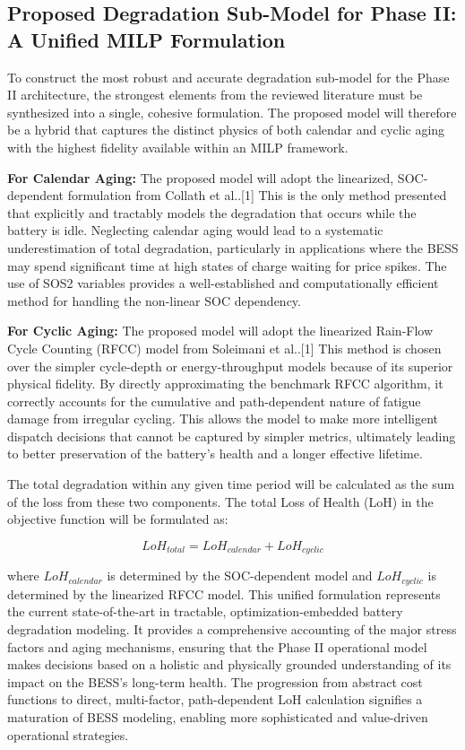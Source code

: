 \subsection{Proposed Degradation Sub-Model for Phase II: A Unified MILP Formulation}

To construct the most robust and accurate degradation sub-model for the Phase II architecture, the strongest elements from the reviewed literature must be synthesized into a single, cohesive formulation. The proposed model will therefore be a hybrid that captures the distinct physics of both calendar and cyclic aging with the highest fidelity available within an MILP framework.

\textbf{For Calendar Aging:} The proposed model will adopt the linearized, SOC-dependent formulation from Collath et al..[1] This is the only method presented that explicitly and tractably models the degradation that occurs while the battery is idle. Neglecting calendar aging would lead to a systematic underestimation of total degradation, particularly in applications where the BESS may spend significant time at high states of charge waiting for price spikes. The use of SOS2 variables provides a well-established and computationally efficient method for handling the non-linear SOC dependency.

\textbf{For Cyclic Aging:} The proposed model will adopt the linearized Rain-Flow Cycle Counting (RFCC) model from Soleimani et al..[1] This method is chosen over the simpler cycle-depth or energy-throughput models because of its superior physical fidelity. By directly approximating the benchmark RFCC algorithm, it correctly accounts for the cumulative and path-dependent nature of fatigue damage from irregular cycling. This allows the model to make more intelligent dispatch decisions that cannot be captured by simpler metrics, ultimately leading to better preservation of the battery's health and a longer effective lifetime.

The total degradation within any given time period will be calculated as the sum of the loss from these two components. The total Loss of Health (LoH) in the objective function will be formulated as:

\begin{equation}
LoH_{total} = LoH_{calendar} + LoH_{cyclic}
\end{equation}

where $LoH_{calendar}$ is determined by the SOC-dependent model and $LoH_{cyclic}$ is determined by the linearized RFCC model. This unified formulation represents the current state-of-the-art in tractable, optimization-embedded battery degradation modeling. It provides a comprehensive accounting of the major stress factors and aging mechanisms, ensuring that the Phase II operational model makes decisions based on a holistic and physically grounded understanding of its impact on the BESS's long-term health. The progression from abstract cost functions to direct, multi-factor, path-dependent LoH calculation signifies a maturation of BESS modeling, enabling more sophisticated and value-driven operational strategies.

